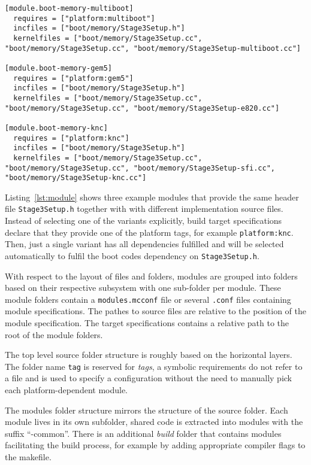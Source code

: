 \begin{lstlisting}[float, label=lst:module, caption=An example module specification.]
[module.boot-memory-multiboot]
  requires = ["platform:multiboot"]
  incfiles = ["boot/memory/Stage3Setup.h"]
  kernelfiles = ["boot/memory/Stage3Setup.cc", "boot/memory/Stage3Setup.cc", "boot/memory/Stage3Setup-multiboot.cc"]

[module.boot-memory-gem5]
  requires = ["platform:gem5"]
  incfiles = ["boot/memory/Stage3Setup.h"]
  kernelfiles = ["boot/memory/Stage3Setup.cc", "boot/memory/Stage3Setup.cc", "boot/memory/Stage3Setup-e820.cc"]

[module.boot-memory-knc]
  requires = ["platform:knc"]
  incfiles = ["boot/memory/Stage3Setup.h"]
  kernelfiles = ["boot/memory/Stage3Setup.cc", "boot/memory/Stage3Setup.cc", "boot/memory/Stage3Setup-sfi.cc", "boot/memory/Stage3Setup-knc.cc"]
\end{lstlisting}

Listing~\ref{lst:module} shows three example modules that provide the same header file \texttt{Stage3Setup.h} together with with different implementation source files. Instead of selecting one of the variants explicitly, build target specifications declare that they provide one of the platform tags, for example \texttt{platform:knc}. Then, just a single variant has all dependencies fulfilled and will be selected automatically to fulfil the boot codes dependency on \texttt{Stage3Setup.h}.

With respect to the layout of files and folders, modules are grouped into folders based on their respective subsystem with one sub-folder per module. These module folders contain a \texttt{modules.mcconf} file or several \texttt{.conf} files containing module specifications. The pathes to source files are relative to the position of the module specification. The target specifications contains a relative path to the root of the module folders.

The top level source folder structure is roughly based on the horizontal layers. The folder name \texttt{tag} is reserved for \emph{tags}, a symbolic requirements do not refer to a file and is used to specify a configuration without the need to manually pick each platform-dependent module.

The modules folder structure mirrors the structure of the source folder. Each module lives in its own subfolder, shared code is extracted into modules with the suffix ``-common''. There is an additional \emph{build} folder that contains modules facilitating the build process, for example by adding appropriate compiler flags to the makefile.

